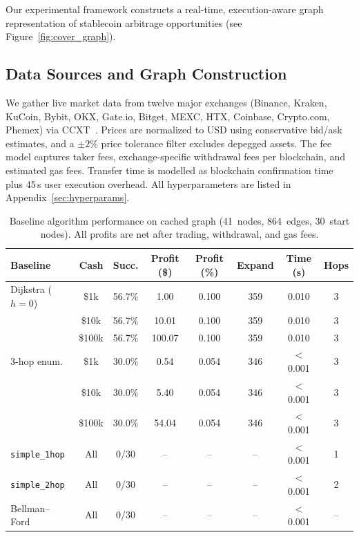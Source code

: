 Our experimental framework constructs a real-time, execution-aware graph representation of stablecoin arbitrage opportunities (see Figure~\ref{fig:cover_graph}).

\subsection{Data Sources and Graph Construction}

We gather live market data from twelve major exchanges (Binance, Kraken, KuCoin, Bybit, OKX, Gate.io, Bitget, MEXC, HTX, Coinbase, Crypto.com, Phemex) via CCXT~\cite{ccxt2024}. Prices are normalized to USD using conservative bid/ask estimates, and a $\pm 2\%$ price tolerance filter excludes depegged assets. The fee model captures taker fees, exchange-specific withdrawal fees per blockchain, and estimated gas fees. Transfer time is modelled as blockchain confirmation time plus 45\,s user execution overhead. All hyperparameters are listed in Appendix~\ref{sec:hyperparams}.

\begin{table}[t]
\centering
\footnotesize
\setlength{\tabcolsep}{4pt}
\caption{Baseline algorithm performance on cached graph (41~nodes, 864~edges, 30~start nodes). 
All profits are net after trading, withdrawal, and gas fees.}
\label{tab:baseline-performance}
\begin{tabular}{lccccccc}
\toprule
\textbf{Baseline} 
& \textbf{Cash} 
& \textbf{Succ.} 
& \textbf{Profit (\$)} 
& \textbf{Profit (\%)} 
& \textbf{Expand}
& \textbf{Time (s)} 
& \textbf{Hops} \\
\midrule

Dijkstra ($h{=}0$)
& \$1k      & 56.7\% &   1.00 & 0.100  & 359 & 0.010 & 3 \\
& \$10k     & 56.7\% &  10.01 & 0.100  & 359 & 0.010 & 3 \\
& \$100k    & 56.7\% & 100.07 & 0.100  & 359 & 0.010 & 3 \\
\midrule

3-hop enum.
& \$1k      & 30.0\% &   0.54 & 0.054  & 346 & $<$0.001 & 3 \\
& \$10k     & 30.0\% &   5.40 & 0.054  & 346 & $<$0.001 & 3 \\
& \$100k    & 30.0\% &  54.04 & 0.054  & 346 & $<$0.001 & 3 \\
\midrule

\texttt{simple\_1hop}
& All       & 0/30  & -- & -- & -- & $<$0.001 & 1 \\
\midrule

\texttt{simple\_2hop}
& All       & 0/30  & -- & -- & -- & $<$0.001 & 2 \\
\midrule

Bellman--Ford
& All       & 0/30  & -- & -- & -- & $<$0.001 & -- \\

\bottomrule
\end{tabular}
\end{table}
